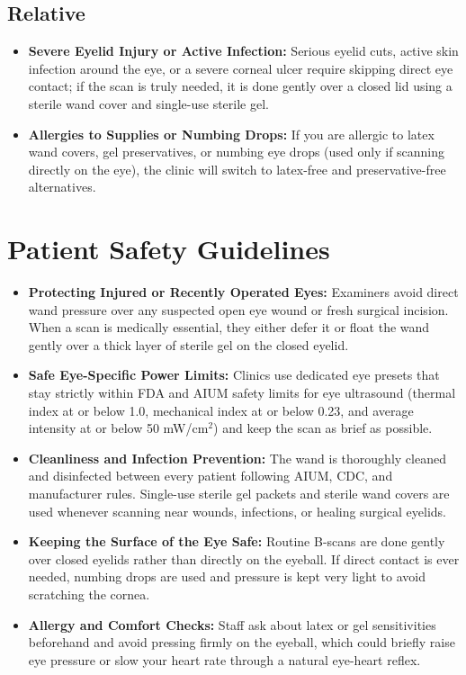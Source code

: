 \subsection{Relative}
\begin{itemize}
    \item \textbf{Severe Eyelid Injury or Active Infection:} Serious eyelid cuts, active skin infection around the eye, or a severe corneal ulcer require skipping direct eye contact; if the scan is truly needed, it is done gently over a closed lid using a sterile wand cover and single-use sterile gel.
    \item \textbf{Allergies to Supplies or Numbing Drops:} If you are allergic to latex wand covers, gel preservatives, or numbing eye drops (used only if scanning directly on the eye), the clinic will switch to latex-free and preservative-free alternatives.
\end{itemize}

\section{Patient Safety Guidelines}
\begin{itemize}
    \item \textbf{Protecting Injured or Recently Operated Eyes:} Examiners avoid direct wand pressure over any suspected open eye wound or fresh surgical incision. When a scan is medically essential, they either defer it or float the wand gently over a thick layer of sterile gel on the closed eyelid.
    \item \textbf{Safe Eye-Specific Power Limits:} Clinics use dedicated eye presets that stay strictly within FDA and AIUM safety limits for eye ultrasound (thermal index at or below 1.0, mechanical index at or below 0.23, and average intensity at or below 50 mW/cm$^2$) and keep the scan as brief as possible.
    \item \textbf{Cleanliness and Infection Prevention:} The wand is thoroughly cleaned and disinfected between every patient following AIUM, CDC, and manufacturer rules. Single-use sterile gel packets and sterile wand covers are used whenever scanning near wounds, infections, or healing surgical eyelids.
    \item \textbf{Keeping the Surface of the Eye Safe:} Routine B-scans are done gently over closed eyelids rather than directly on the eyeball. If direct contact is ever needed, numbing drops are used and pressure is kept very light to avoid scratching the cornea.
    \item \textbf{Allergy and Comfort Checks:} Staff ask about latex or gel sensitivities beforehand and avoid pressing firmly on the eyeball, which could briefly raise eye pressure or slow your heart rate through a natural eye-heart reflex.
\end{itemize}

